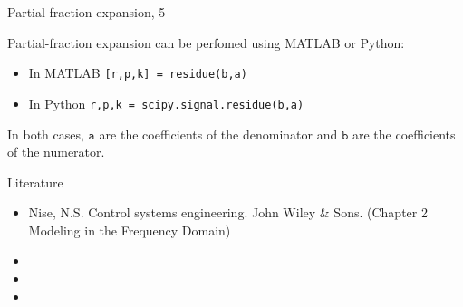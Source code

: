 \documentclass{beamer}
\begin{document}
\begin{frame}{Partial-fraction expansion, 5}
	\begin{flushleft}
		
		Partial-fraction expansion can be perfomed using MATLAB or Python:
		
		\bigskip
		
		\begin{itemize}
			\item In MATLAB \texttt{[r,p,k] = residue(b,a)}
				
			\item In Python \texttt{r,p,k = scipy.signal.residue(b,a)}
		\end{itemize}
		
		\bigskip
		
		In both cases, $\texttt{a}$ are the coefficients of the denominator and $\texttt{b}$ are the coefficients of the numerator. 
		
	\end{flushleft}
\end{frame}





\begin{frame}{Literature}

\begin{itemize}
	
	
	\item Nise, N.S. Control systems engineering. John Wiley \& Sons. (Chapter 2 Modeling in the Frequency Domain)	
	
\item {}

\item {}

\item {}

\end{itemize}

\end{frame}



\myqrframe
\end{document}
